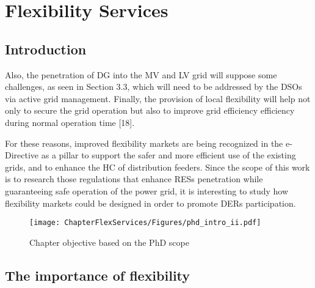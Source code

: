 \chapter{Flexibility Services}
\label{chapterFlexibility}

\section{Introduction}

Also, the penetration of DG into the MV and
LV grid will suppose some challenges, as seen in Section 3.3, which will need to be addressed
by the DSOs via active grid management. Finally, the provision of local flexibility will help not
only to secure the grid operation but also to improve grid efficiency efficiency during normal
operation time [18].

For these reasons, improved flexibility markets are being recognized in the e-Directive as a
pillar to support the safer and more efficient use of the existing grids, and to enhance the HC of
distribution feeders. Since the scope of this work is to research those regulations that enhance
RESs penetration while guaranteeing safe operation of the power grid, it is interesting to study
how flexibility markets could be designed in order to promote DERs participation.

\begin{figure}[]
	\centering
	\texttt{[image: ChapterFlexServices/Figures/phd\_intro\_ii.pdf]}
		\caption{Chapter objective based on the PhD scope}
	\label{fig:chapter_obj_ii}  
\end{figure}

\section{The importance of flexibility}

